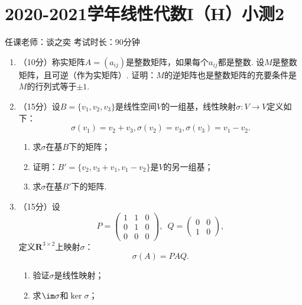 \section{2020-2021学年线性代数I（H）小测2}

\begin{center}
    任课老师：谈之奕\hspace{4em} 考试时长：90分钟
\end{center}

\begin{enumerate}
    \item （10分）称实矩阵$A=(a_{ij})$是整数矩阵，如果每个$a_{ij}$都是整数. 设$M$是整数矩阵，且可逆（作为实矩阵）. 证明：$M$的逆矩阵也是整数矩阵的充要条件是$M$的行列式等于$\pm 1$.
	\item （15分）设$B=\{v_1,v_2,v_3\}$是线性空间$V$的一组基，线性映射$\sigma\colon V\to V$定义如下：
	\[\sigma(v_1)=v_2+v_3,\sigma(v_2)=v_3,\sigma(v_3)=v_1-v_2.\]
    \begin{enumerate}
        \item 求$\sigma$在基$B$下的矩阵；

        \item 证明：$B'=\{v_2,v_3+v_1,v_1-v_2\}$是$V$的另一组基；

        \item 求$\sigma$在基$B'$下的矩阵.
    \end{enumerate}
	\item （15分）设
	\[P=\begin{pmatrix}
        1 & 1 & 0 \\ 0 & 1 & 0 \\ 0 & 0 & 0
    \end{pmatrix},\enspace Q=\begin{pmatrix}
        0 & 0 \\ 1 & 0
    \end{pmatrix},\]
    定义$\mathbf{R}^{3\times 2}$上映射$\sigma$：
    \[\sigma(A)=PAQ.\]
    \begin{enumerate}
        \item 验证$\sigma$是线性映射；

        \item 求$\im\sigma$和$\ker\sigma$；


\end{enumerate}
\end{enumerate}
